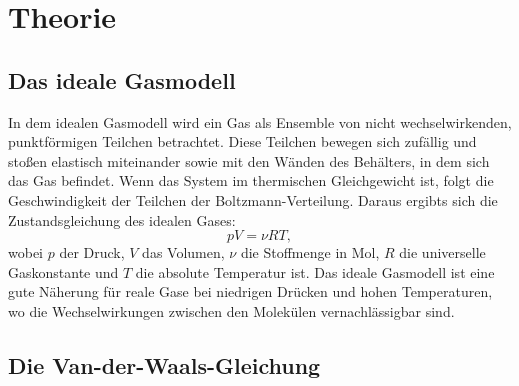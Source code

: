 \section{Theorie}
\label{sec:Theorie}

\subsection{Das ideale Gasmodell}
\label{subsec:IdealesGasmodell}

    In dem idealen Gasmodell wird ein Gas als Ensemble von nicht wechselwirkenden, punktförmigen Teilchen betrachtet. 
    Diese Teilchen bewegen sich zufällig und stoßen elastisch miteinander sowie mit den Wänden des Behälters, in dem sich das Gas befindet. 
    Wenn das System im thermischen Gleichgewicht ist, folgt die Geschwindigkeit der Teilchen der Boltzmann-Verteilung.
    Daraus ergibts sich die Zustandsgleichung des idealen Gases:
    \begin{equation}
        pV = \nu RT,
        \label{eq:idealesGas}
    \end{equation}
    wobei \(p\) der Druck, \(V\) das Volumen, \(\nu\) die Stoffmenge in Mol, \(R\) die universelle Gaskonstante und \(T\) die absolute Temperatur ist.
    Das ideale Gasmodell ist eine gute Näherung für reale Gase bei niedrigen Drücken und hohen Temperaturen, 
    wo die Wechselwirkungen zwischen den Molekülen vernachlässigbar sind. 

\subsection{Die Van-der-Waals-Gleichung}
\label{subsec:VanDerWaalsGleichung}


